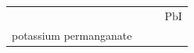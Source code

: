 \begin{enumerate}[noitemsep, label=\textbf{\arabic*}. ]
{{\begin{center}
\begin{xtabular}[t]{|l|l|l|l|}
    
         &
    
    
         &
    
    
         &
    
    
        \begin{math}\mathrm{PbI}\end{math}%
     \tabularnewline{}
    
    
        potassium permanganate &
    
    
         &
    
    
         &
    
    
     \tabularnewline{}
    

\end{xtabular}
\end{center}}}
\end{enumerate}
